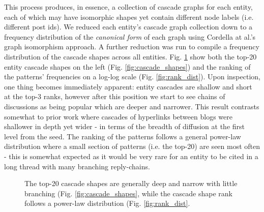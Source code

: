 \documentclass[review]{elsarticle}
\begin{document}
This process produces, in essence, a collection of cascade graphs for each entity, each of which may have isomorphic shapes yet contain different node labels (i.e. different post ids).
We reduced each entity's cascade graph collection down to a frequency distribution of the \emph{canonical form} of each graph using Cordella at al.'s \cite{cordella2001improved} graph isomorphism approach.
A further reduction was run to compile a frequency distribution of the cascade shapes across all entities.
Fig. \ref{fig:entity_cascades} show both the top-20 entity cascade shapes on the left (Fig. \ref{fig:cascade_shapes}) and the ranking of the patterns' frequencies on a log-log scale (Fig. \ref{fig:rank_dist}).
Upon inspection, one thing becomes immediately apparent: entity cascades are shallow and short at the top-3 ranks, however after this position we start to see chains of discussions as being popular which are deeper and narrower.
This result contrasts somewhat to prior work \cite{leskovec2007patterns} where cascades of hyperlinks between blogs were shallower in depth yet wider - in terms of the breadth of diffusion at the first level from the seed. 
The ranking of the patterns follows a general power-law distribution where a small section of patterns (i.e. the top-20) are seen most often - this is somewhat expected as it would be very rare for an entity to be cited in a long thread with many branching reply-chains.

\begin{figure}[ht!]
  \begin{center}
  \end{center}    
  \caption{The top-20 cascade shapes are generally deep and narrow with little branching (Fig. \ref{fig:cascade_shapes}, while the cascade shape rank follows a power-law distribution (Fig. \ref{fig:rank_dist}.}
  \label{fig:entity_cascades}
\end{figure}
\end{document}
